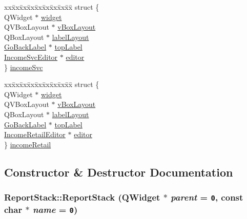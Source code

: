 \begin{CompactItemize}
\begin{tabbing}
\end{tabbing}\item 
\begin{tabbing}
xx\=xx\=xx\=xx\=xx\=xx\=xx\=xx\=xx\=\kill
struct \{\\
\>QWidget $\ast$ \hyperlink{classReportStack_r100}{widget}\\
\>QVBoxLayout $\ast$ \hyperlink{classReportStack_r101}{vBoxLayout}\\
\>QBoxLayout $\ast$ \hyperlink{classReportStack_r102}{labelLayout}\\
\>\hyperlink{classGoBackLabel}{GoBackLabel} $\ast$ \hyperlink{classReportStack_r103}{topLabel}\\
\>\hyperlink{classIncomeSvcEditor}{IncomeSvcEditor} $\ast$ \hyperlink{classReportStack_r104}{editor}\\
\} \hyperlink{classReportStack_r105}{incomeSvc}\\

\end{tabbing}\item 
\begin{tabbing}
xx\=xx\=xx\=xx\=xx\=xx\=xx\=xx\=xx\=\kill
struct \{\\
\>QWidget $\ast$ \hyperlink{classReportStack_r106}{widget}\\
\>QVBoxLayout $\ast$ \hyperlink{classReportStack_r107}{vBoxLayout}\\
\>QBoxLayout $\ast$ \hyperlink{classReportStack_r108}{labelLayout}\\
\>\hyperlink{classGoBackLabel}{GoBackLabel} $\ast$ \hyperlink{classReportStack_r109}{topLabel}\\
\>\hyperlink{classIncomeRetailEditor}{IncomeRetailEditor} $\ast$ \hyperlink{classReportStack_r110}{editor}\\
\} \hyperlink{classReportStack_r111}{incomeRetail}\\

\end{tabbing}\end{CompactItemize}


\subsection{Constructor \& Destructor Documentation}
\hypertarget{classReportStack_a0}{
\subsubsection[ReportStack]{\setlength{\rightskip}{0pt plus 5cm}Report\-Stack::Report\-Stack (QWidget $\ast$ {\em parent} = {\tt 0}, const char $\ast$ {\em name} = {\tt 0})}}
\label{classReportStack_a0}


